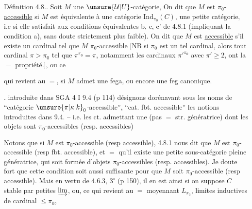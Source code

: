 \uline{Définition} 4.8.. Soit $M$ une $\unsure{\mathcal U|U}$-catégorie,  On dit que $M$ est $\pi_0$-\uline{accessible} si $M$ est équivalente à une catégorie $\mathrm{Ind}_{\pi_0}(C)$,  une petite catégorie, i.e si elle satisfait aux conditions équivalentes b, c, c' de 4.8.1 (impliquant la condition a), sans doute strictement plus faible). On dit que $M$ est \uline{accessible} s'il existe un cardinal tel que $M$  $\pi_0$-accessible [NB si $\pi_0$ est un tel cardinal, alors tout cardinal $\pi>\pi_0$ tel que $\pi^{\pi_0}=\pi$, notamment les cardinaux $\pi'^{\pi_0}$ avec $\pi'\geq2$, ont la $=$ propriété.], ou ce

qui revient au $=$,  si $M$ admet une fega, ou encore une feg canonique.


.     introduite dans SGA 4 I 9.4 (p 114)\unsure{);|),|;}   désignons dorénavant sous les noms de ``catégorie  $\unsure{\pi|\kappa|k}_0$-accessible'', ``cat. fbt. accessible'' les notions introduites dans 9.4. -- i.e. les ct. admettant une      (pas $=$ str. génératrice) dont les objets sont $\pi_0$-accessibles (resp. accessibles)

Notons que si $M$ est $\pi_0$-accessible (resp accessible),  4.8.1 nous dit que $M$ est  $\pi_0$-accessible (resp fbt. accessible), et $=$ qu'il existe une petite sous-catégorie pleine  génératrice, qui soit formée d'objets $\pi_0$-accessibles (resp. accessibles). Je doute fort que cette  condition  soit aussi suffisante pour que $M$ soit $\pi_0$-accessible (resp accessible). Mais en vertu de 4.6.3, $3^\circ$ (p 150), il en est ainsi si on suppose $C$ stable par petites $\varinjlim$, ou, ce qui revient au $=$ moyennant $L_{\pi_0}$,   limites inductives de cardinal $\leq\pi_0$,

